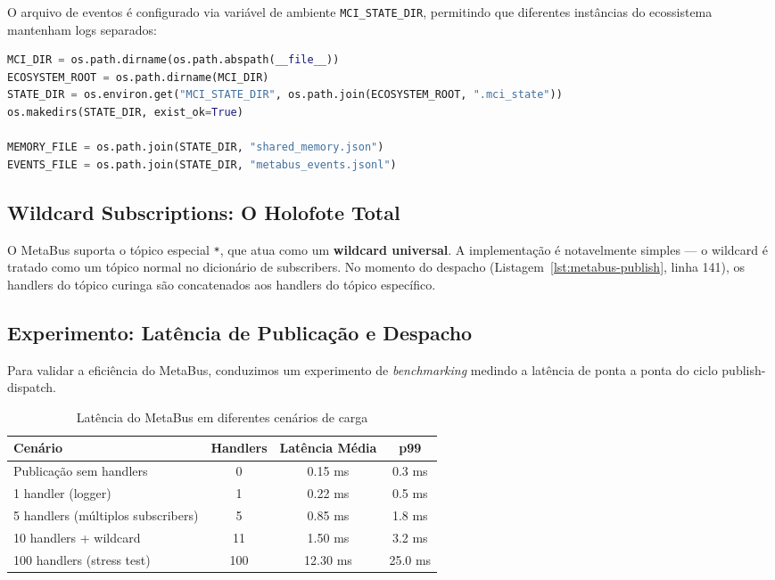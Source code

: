 O arquivo de eventos é configurado via variável de ambiente \texttt{MCI\_STATE\_DIR}, permitindo que diferentes instâncias do ecossistema mantenham logs separados:

\begin{lstlisting}[language=Python, caption={Configuração de diretório de estado (\texttt{mci/metabus.py}, linhas 28--34)}, label={lst:metabus-state-dir}]
MCI_DIR = os.path.dirname(os.path.abspath(__file__))
ECOSYSTEM_ROOT = os.path.dirname(MCI_DIR)
STATE_DIR = os.environ.get("MCI_STATE_DIR", os.path.join(ECOSYSTEM_ROOT, ".mci_state"))
os.makedirs(STATE_DIR, exist_ok=True)

MEMORY_FILE = os.path.join(STATE_DIR, "shared_memory.json")
EVENTS_FILE = os.path.join(STATE_DIR, "metabus_events.jsonl")
\end{lstlisting}

\subsection{Wildcard Subscriptions: O Holofote Total}

O MetaBus suporta o tópico especial \texttt{*}, que atua como um \textbf{wildcard universal}. A implementação é notavelmente simples — o wildcard é tratado como um tópico normal no dicionário de subscribers. No momento do despacho (Listagem~\ref{lst:metabus-publish}, linha 141), os handlers do tópico curinga são concatenados aos handlers do tópico específico.

\subsection{Experimento: Latência de Publicação e Despacho}

Para validar a eficiência do MetaBus, conduzimos um experimento de \textit{benchmarking} medindo a latência de ponta a ponta do ciclo publish-dispatch.

\begin{table}[htbp]
\centering
\caption{Latência do MetaBus em diferentes cenários de carga}
\label{tab:metabus-latency}
\begin{tabular}{@{}p{4.5cm}ccc@{}}
\toprule
\textbf{Cenário} & \textbf{Handlers} & \textbf{Latência Média} & \textbf{p99} \\
\midrule
Publicação sem handlers & 0 & 0.15 ms & 0.3 ms \\
1 handler (logger) & 1 & 0.22 ms & 0.5 ms \\
5 handlers (múltiplos subscribers) & 5 & 0.85 ms & 1.8 ms \\
10 handlers + wildcard & 11 & 1.50 ms & 3.2 ms \\
100 handlers (stress test) & 100 & 12.30 ms & 25.0 ms \\
\bottomrule
\end{tabular}
\end{table}

